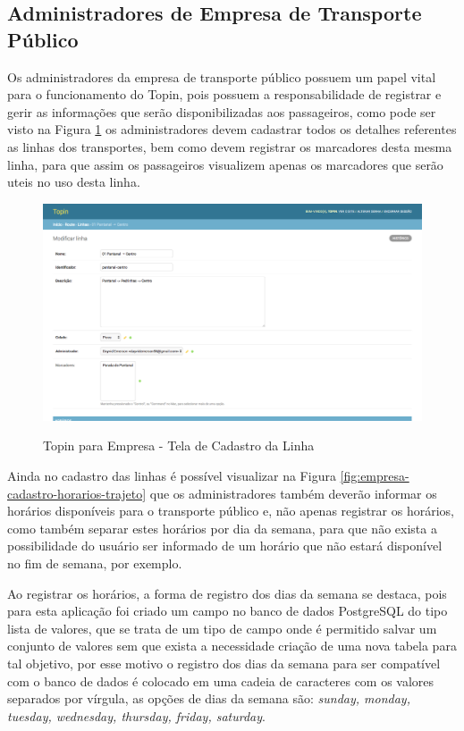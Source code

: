 {{{{{{{\subsection{Administradores de Empresa de Transporte Público}

Os administradores da empresa de transporte público possuem um papel vital para o funcionamento do Topin, pois possuem a responsabilidade de registrar e gerir as informações que serão disponibilizadas aos passageiros, como pode ser visto na Figura \ref{fig:empresa-cadastro-linha} os administradores devem cadastrar todos os detalhes referentes as linhas dos transportes, bem como devem registrar os marcadores desta mesma linha, para que assim os passageiros visualizem apenas os marcadores que serão uteis no uso desta linha.

\begin{figure}[t]
\caption{Topin para Empresa - Tela de Cadastro da Linha}
\centering
\includegraphics[width=1.0\textwidth]{imagens/cadastro-linha.png}
\label{fig:empresa-cadastro-linha}
\end{figure}

Ainda no cadastro das linhas é possível visualizar na Figura \ref{fig:empresa-cadastro-horarios-trajeto} que os administradores também deverão informar os horários disponíveis para o transporte público e, não apenas registrar os horários, como também separar estes horários por dia da semana, para que não exista a possibilidade do usuário ser informado de um horário que não estará disponível no fim de semana, por exemplo.

Ao registrar os horários, a forma de registro dos dias da semana se destaca, pois para esta aplicação foi criado um campo no banco de dados PostgreSQL do tipo lista de valores, que se trata de um tipo de campo onde é permitido salvar um conjunto de valores sem que exista a necessidade criação de uma nova tabela para tal objetivo, por esse motivo o registro dos dias da semana para ser compatível com o banco de dados é colocado em uma cadeia de caracteres com os valores separados por vírgula, as opções de dias da semana são: \textit{sunday, monday, tuesday, wednesday, thursday, friday, saturday}.

}}}}}}}
